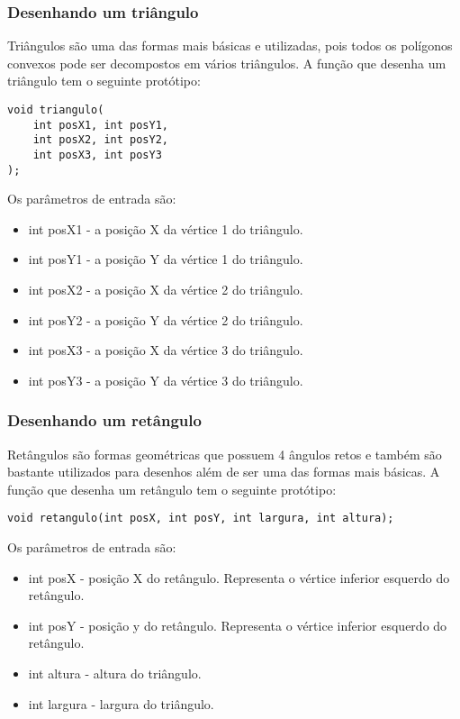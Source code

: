 \documentclass[12pt, %
openright,
oneside, %
a4paper,    %
brazil]{facom-ufu-abntex2}
\begin{document}
\subsubsection{Desenhando um triângulo}
Triângulos são uma das formas mais básicas e utilizadas, pois todos os polígonos convexos pode ser decompostos em vários triângulos. A função que desenha um triângulo tem o seguinte protótipo:

\begin{verbatim}
void triangulo(
    int posX1, int posY1,
    int posX2, int posY2,
    int posX3, int posY3
);
\end{verbatim}

Os parâmetros de entrada são:

\begin{itemize}
    \item int posX1 - a posição X da vértice 1 do triângulo.
    \item int posY1 - a posição Y da vértice 1 do triângulo.

    \item int posX2 - a posição X da vértice 2 do triângulo.
    \item int posY2 - a posição Y da vértice 2 do triângulo.

    \item int posX3 - a posição X da vértice 3 do triângulo.
    \item int posY3 - a posição Y da vértice 3 do triângulo.
\end{itemize}

\subsubsection{Desenhando um retângulo}
Retângulos são formas geométricas que possuem 4 ângulos retos e também são bastante utilizados para desenhos além de ser uma das formas mais básicas. A função que desenha um retângulo tem o seguinte protótipo:

\begin{verbatim}
void retangulo(int posX, int posY, int largura, int altura);
\end{verbatim}

Os parâmetros de entrada são:

\begin{itemize}
    \item int posX - posição X do retângulo. Representa o vértice inferior esquerdo do retângulo.
    \item int posY - posição y do retângulo. Representa o vértice inferior esquerdo do retângulo.
    \item int altura - altura do triângulo.
    \item int largura - largura do triângulo.
\end{itemize}
\end{document}
